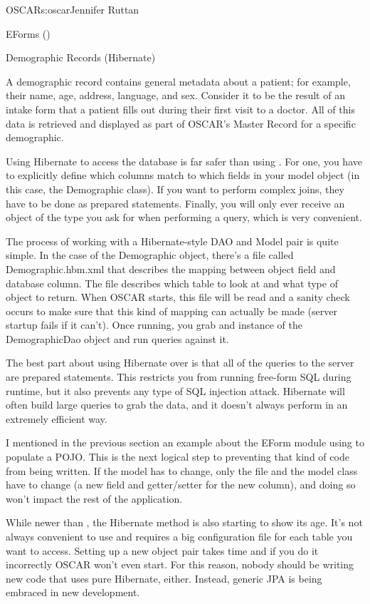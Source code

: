 \begin{aosachapter}{OSCAR}{s:oscar}{Jennifer Ruttan}
\begin{aosasect1}{EForms ()}
\end{aosasect1}

\begin{aosasect1}{Demographic Records (Hibernate)}

A demographic record contains general metadata about a patient; for
example, their name, age, address, language, and sex. Consider it to
be the result of an intake form that a patient fills out during their
first visit to a doctor. All of this data is retrieved and displayed
as part of OSCAR's Master Record for a specific demographic.

Using Hibernate to access the database is far safer than
using . For one, you have to explicitly define which
columns match to which fields in your model object (in this case, the
Demographic class). If you want to perform complex joins, they have to
be done as prepared statements. Finally, you will only ever receive an
object of the type you ask for when performing a query, which is very
convenient.

The process of working with a Hibernate-style DAO and Model pair is
quite simple. In the case of the Demographic object, there's a file
called Demographic.hbm.xml that describes the mapping between object
field and database column. The file describes which table to look at
and what type of object to return. When OSCAR starts, this file will
be read and a sanity check occurs to make sure that this kind of
mapping can actually be made (server startup fails if it can't). Once
running, you grab and instance of the DemographicDao object and run
queries against it.

The best part about using Hibernate over  is that all
of the queries to the server are prepared statements. This restricts
you from running free-form SQL during runtime, but it also prevents
any type of SQL injection attack. Hibernate will often build large
queries to grab the data, and it doesn't always perform in an
extremely efficient way.

I mentioned in the previous section an example about the EForm module
using  to populate a POJO. This is the next logical
step to preventing that kind of code from being written. If the model
has to change, only the  file and the model class have
to change (a new field and getter/setter for the new column), and
doing so won't impact the rest of the application.

While newer than , the Hibernate method is also
starting to show its age. It's not always convenient to use and
requires a big configuration file for each table you want to
access. Setting up a new object pair takes time and if you do it
incorrectly OSCAR won't even start. For this reason, nobody should be
writing new code that uses pure Hibernate, either. Instead, generic
JPA is being embraced in new development.


\end{aosasect1}
\end{aosachapter}
